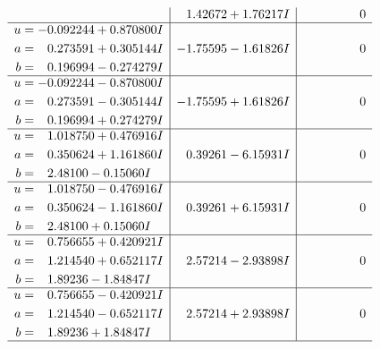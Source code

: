 \documentclass[1p]{elsarticle_modified}
\theoremstyle{definition}
\begin{document}
$$\begin{array}{c|c|c}
 & \phantom{-}1.42672 + 1.76217 I & \phantom{-0.000000 } 0 \\ \hline\begin{aligned}
u &= -0.092244 + 0.870800 I \\
a &= \phantom{-}0.273591 + 0.305144 I \\
b &= \phantom{-}0.196994 - 0.274279 I\end{aligned}
 & -1.75595 - 1.61826 I & \phantom{-0.000000 } 0 \\ \hline\begin{aligned}
u &= -0.092244 - 0.870800 I \\
a &= \phantom{-}0.273591 - 0.305144 I \\
b &= \phantom{-}0.196994 + 0.274279 I\end{aligned}
 & -1.75595 + 1.61826 I & \phantom{-0.000000 } 0 \\ \hline\begin{aligned}
u &= \phantom{-}1.018750 + 0.476916 I \\
a &= \phantom{-}0.350624 + 1.161860 I \\
b &= \phantom{-}2.48100 - 0.15060 I\end{aligned}
 & \phantom{-}0.39261 - 6.15931 I & \phantom{-0.000000 } 0 \\ \hline\begin{aligned}
u &= \phantom{-}1.018750 - 0.476916 I \\
a &= \phantom{-}0.350624 - 1.161860 I \\
b &= \phantom{-}2.48100 + 0.15060 I\end{aligned}
 & \phantom{-}0.39261 + 6.15931 I & \phantom{-0.000000 } 0 \\ \hline\begin{aligned}
u &= \phantom{-}0.756655 + 0.420921 I \\
a &= \phantom{-}1.214540 + 0.652117 I \\
b &= \phantom{-}1.89236 - 1.84847 I\end{aligned}
 & \phantom{-}2.57214 - 2.93898 I & \phantom{-0.000000 } 0 \\ \hline\begin{aligned}
u &= \phantom{-}0.756655 - 0.420921 I \\
a &= \phantom{-}1.214540 - 0.652117 I \\
b &= \phantom{-}1.89236 + 1.84847 I\end{aligned}
 & \phantom{-}2.57214 + 2.93898 I & \phantom{-0.000000 } 0\\
 \hline 
 \end{array}$$\newpage$$\begin{array}{c|c|c}  

\end{array}$$
\end{document}
